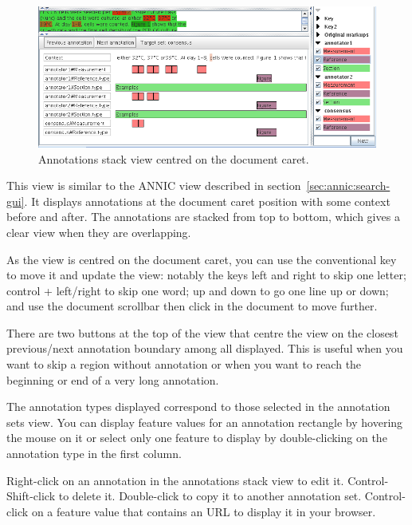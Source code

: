 
\begin{figure}[htb]
\begin{center}
\includegraphics[width=14cm]{annotations-stack-view.png}
\end{center}
\caption{Annotations stack view centred on the document caret.}
\label{fig:annotationstackview}
\end{figure}

This view is similar to the ANNIC view described in
section~\ref{sec:annic:search-gui}. It displays annotations at the document
caret position with some context before and after. The annotations are
stacked from top to bottom, which gives a clear view when they are
overlapping.

As the view is centred on the document caret, you can use the conventional
key to move it and update the view: notably the keys left and right to skip
one letter; control + left/right to skip one word; up and down to go one
line up or down; and use the document scrollbar then click in the document
to move further.

There are two buttons at the top of the view that centre the view on the
closest previous/next annotation boundary among all displayed. This is
useful when you want to skip a region without annotation or when you want to
reach the beginning or end of a very long annotation.

The annotation types displayed correspond to those selected in the
annotation sets view. You can display feature values for an annotation
rectangle by hovering the mouse on it or select only one feature to display
by double-clicking on the annotation type in the first column.

Right-click on an annotation in the annotations stack view to edit
it. Control-Shift-click to delete it. Double-click to copy it to another
annotation set. Control-click on a feature value that contains an URL to
display it in your browser.

